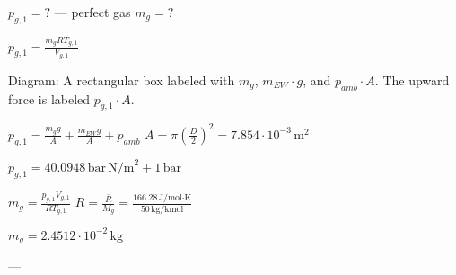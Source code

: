 \( p_{g,1} = ? \) — perfect gas  
\( m_g = ? \)  

\( p_{g,1} = \frac{m_g R T_{g,1}}{V_{g,1}} \)  

Diagram: A rectangular box labeled with \( m_g \), \( m_{EW} \cdot g \), and \( p_{amb} \cdot A \). The upward force is labeled \( p_{g,1} \cdot A \).  

\( p_{g,1} = \frac{m_g g}{A} + \frac{m_{EW} g}{A} + p_{amb} \)  
\( A = \pi \left(\frac{D}{2}\right)^2 = 7.854 \cdot 10^{-3} \, \text{m}^2 \)  

\( p_{g,1} = 40.0948 \, \text{bar} \, \text{N/m}^2 + 1 \, \text{bar} \)  

\( m_g = \frac{p_{g,1} V_{g,1}}{R T_{g,1}} \)  
\( R = \frac{\bar{R}}{M_g} = \frac{166.28 \, \text{J/mol·K}}{50 \, \text{kg/kmol}} \)  

\( m_g = 2.4512 \cdot 10^{-2} \, \text{kg} \)  

---